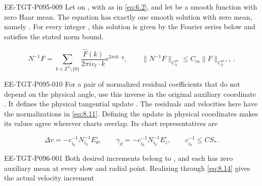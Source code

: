 \begin{lemma}\label{lem:8.6}
\begin{EESegment}{EE-TGT-P095-009}
Let  on
, with  as in \eqref{eq:6.2}, and let
 be a smooth function with zero Haar mean. The equation
 has exactly one smooth solution with zero mean, namely
. For every integer
, this solution is given by the Fourier series below and satisfies the
stated norm bound.
\end{EESegment}
\begin{equation}
N^{-1}F=\sum_{k\in\mathbb Z^2\setminus\{0\}}
\frac{\widehat F(k)}{2\pi i v_t\cdot k}e^{2\pi i k\cdot y},
\qquad
\|N^{-1}F\|_{C_y^m}\le C_m\|F\|_{C_y^{m+4}}.
\tag{8.19}\label{eq:8.19}
\end{equation}
\begin{EESegment}{EE-TGT-P095-010}
For a pair  of normalized residual
coefficients that do not depend on the physical angle, use this inverse in the original auxiliary
coordinate . It defines the physical tangential update
.
%
The residuals and velocities here have the normalizations in \eqref{eq:8.11}. Defining the update
in physical coordinates makes its values agree wherever charts overlap. Its chart representatives
are
\end{EESegment}
\begin{equation}
\Delta v=-c_{i_0}^{-1}N_{i_0}^{-1}E_\theta^\circ,
\qquad
\gamma_d=-c_{i_0}^{-1}N_{i_0}^{-1}E_z^\circ,
\qquad
c_{i_0}^{-1}\le CS_*.
\tag{8.20}\label{eq:8.20}
\end{equation}
\begin{EESegment}{EE-TGT-P096-001}
Both desired increments  belong to
, and each has zero auxiliary mean at every slow and radial
point. Realizing  through \eqref{eq:8.14} gives the actual velocity
increment
\end{EESegment}
\begin{equation}
\begin{gathered}

\end{gathered}
\end{equation}
\end{lemma}
